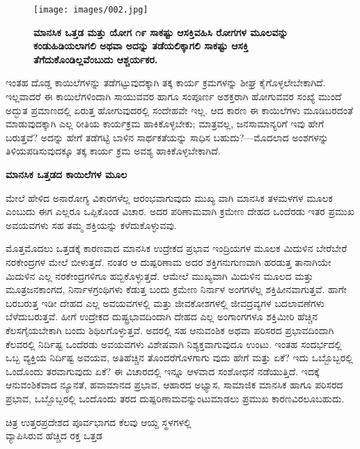 \begin{figure}
\texttt{[image: images/002.jpg]}
\caption{ \textbf{ಮಾನಸಿಕ ಒತ್ತಡ ಮತ್ತು ಯೋಗ ೧೯ ಸಾಕಷ್ಟು ಆಸಕ್ತಿವಹಿಸಿ ರೋಗಗಳ ಮೂಲವನ್ನು ಕಂಡುಹಿಡಿಯಲಾಗಲಿ ಅಥವಾ ಅದನ್ನು ತಡೆಯಲಿಕ್ಕಾಗಲಿ ಸಾಕಷ್ಟು ಆಸಕ್ತಿ ತೆಗೆದುಕೊಂಡಿಲ್ಲವೆಂಬುದು ಆಶ್ಚರ್ಯಕರ.} }
\end{figure}

ಇಂತಹ ದೊಡ್ಡ ಕಾಯಿಲೆಗಳನ್ನು ತಡೆಗಟ್ಟುವುದಕ್ಕಾಗಿ ತಕ್ಕ ಕಾರ್ಯ ಕ್ರಮಗಳನ್ನು ಶೀಘ್ರ ಕೈಗೊಳ್ಳಲೇಬೇಕಾಗಿದೆ. ಇಲ್ಲವಾದರೆ ಈ ಕಾಯಿಲೆಗಳಿಂದಾಗಿ ಸಾಯುವವರ ಹಾಗೂ ಸಂಪೂರ್ಣ ಅಶಕ್ತರಾಗಿ ಹೋಗುವವರ ಸಂಖ್ಯೆ ಮುಂದೆ ಅದ್ಭುತ ಪ್ರಮಾಣದಲ್ಲಿ ಏರುತ್ತ ಹೋಗುವುದರಲ್ಲಿ ಸಂದೇಹವೇ ಇಲ್ಲ. ಆದ ಕಾರಣ ಈ ಕಾಯಿಲೆಗಳು ಮೂಡಿಬರದಂತೆ ಮಾಡುವುದಕ್ಕಾಗಿ ಎಲ್ಲ ರೀತಿಯ ಕಾರ್ಯಕ್ರಮ ಹಾಕಿಕೊಳ್ಳಬೇಕು; ಮಾತ್ರವಲ್ಲ, ಜನಸಾಮಾನ್ಯರಿಗೆ ಇವು ಹೇಗೆ ಬರುತ್ತವೆ? ಅದನ್ನು ಹೇಗೆ ತಡೆಗಟ್ಟಿ ಬಾಳಿನ ಸಾರ್ಥಕತೆಯನ್ನು ಸಾಧಿಸ ಬಹುದು?—ಮೊದಲಾದ ಅಂಶಗಳನ್ನು ತಿಳಿಯಪಡಿಸುವುದಕ್ಕೂ ತಕ್ಕ ಕಾರ್ಯ ಕ್ರಮ ಅವಶ್ಯ ಹಾಕಿಕೊಳ್ಳಬೇಕಾಗಿದೆ.

\textbf{ಮಾನಸಿಕ ಒತ್ತಡದ ಕಾಯಿಲೆಗಳ ಮೂಲ}

ಮೇಲೆ ಹೇಳಿದ ಅನಾರೋಗ್ಯ ವಿಕಾರಗಳೆಲ್ಲ ಆರಂಭವಾಗುವುದು ಮುಖ್ಯ ವಾಗಿ ಮಾನಸಿಕ ತಳಮಳಗಳ ಮೂಲಕ ಎಂಬುದು ಈಗ ಎಲ್ಲರೂ ಒಪ್ಪಿಕೊಂಡ ವಿಚಾರ. ಅದರ ಪರಿಣಾಮವಾಗಿ ಕ್ರಮೇಣ ದೇಹದ ಒಂದೆರಡು ಇತರ ಪ್ರಮುಖ ಅವಯವಗಳು ಸಹ ತಮ್ಮ ಶಕ್ತಿಯನ್ನು ಕಳೆದುಕೊಳ್ಳುವವು.

ಮೊತ್ತಮೊದಲು ಒತ್ತಡಕ್ಕೆ ಕಾರಣವಾದ ಮಾನಸಿಕ ಉದ್ರೇಕದ ಪ್ರಭಾವ ಇಂದ್ರಿಯಗಳ ಮೂಲಕ ಮಿದುಳಿನ ಬೇರೆಬೇರೆ ನರಕೇಂದ್ರಗಳ ಮೇಲೆ ಬೀಳುತ್ತದೆ. ನಂತರ ಆ ದುಷ್ಪರಿಣಾಮ ಅದರ ಶಕ್ತಿಗನುಗುಣವಾಗಿ ಹರಡುತ್ತ ತಾನಾಗಿಯೇ ಮಿದುಳಿನ ಎಲ್ಲ ನರಕೇಂದ್ರಗಳಿಗೂ ಹಬ್ಬಿಕೊಳ್ಳುತ್ತದೆ. ಆಮೇಲೆ ಮುಖ್ಯವಾಗಿ ಮಿದುಳಿನ ಮೂಲದ ಮತ್ತು ಮೂತ್ರಜನಕಾಂಗದ, ನಿರ್ನಾಳಗ್ರಂಥಿಗಳು  ಕೆಡುತ್ತ ಬಂದು ಕ್ರಮೇಣ ನಿರ್ನಾಳ ಅಂಗಗಳೆಲ್ಲ  ಶಕ್ತಿಹೀನವಾಗುತ್ತವೆ. ಹಾಗೇ ಬರಬರುತ್ತ ಇಡೀ ದೇಹದ ಎಲ್ಲ ಅವಯವಗಳಲ್ಲಿ ಮತ್ತು ಜೀವಕೋಶಗಳಲ್ಲಿ ಜೀವದ್ರವ್ಯಗಳ ಬದಲಾವಣೆಗಳು  ಬೆಳೆದುಬರುತ್ತವೆ. ಹೀಗೆ ಉದ್ರೇಕದ ದುಷ್ಟ್ರಭಾವದಿಂದಾಗಿ ದೇಹದ ಎಲ್ಲ ಅಂಗಾಂಗಗಳೂ ಶಕ್ತಿಮೀರಿ ಹೆಚ್ಚಿನ ಕೆಲಸಗೈಯಬೇಕಾಗಿ ಬಂದು ಶಿಥಿಲಗೊಳ್ಳುತ್ತವೆ. ಅದರಲ್ಲಿ ಸಹ ಆನುವಂಶಿಕ ಅಥವಾ ಪರಿಸರದ ಪ್ರಭಾವದಿಂದಾಗಿ ಕೆಲವರಲ್ಲಿ ನಿರ್ದಿಷ್ಟ ಒಂದೆರಡು ಅವಯವಗಳು ವಿಶೇಷವಾಗಿ ನಿಶ್ಯಕ್ತವಾಗುವುದೂ ಉಂಟು. ಇಂತಹ ಸಂದರ್ಭದಲ್ಲಿ ಒಬ್ಬ ವ್ಯಕ್ತಿಯ ನಿರ್ದಿಷ್ಟ ಅವಯವ, ಅತಿಹೆಚ್ಚಿನ ತೊಂದರೆಗೊಳಗಾಗು ವುದು ಹೇಗೆ ಮತ್ತು ಏಕೆ? ಇದು ಒಬ್ಬೊಬ್ಬರಲ್ಲಿ ಒಂದೊಂದು ತರವಾಗುವುದು ಏಕೆ? ಈ ವಿಚಾರದಲ್ಲಿ ಇನ್ನೂ ಆಳವಾದ ಸಂಶೋಧನೆ ನಡೆಯುತ್ತಿದೆ. ಇದಕ್ಕೆ ಆನುವಂಶಿಕವಾದ ನ್ಯೂನತೆ, ಹವಾಮಾನದ ಪ್ರಭಾವ, ಆಹಾರದ ಅಭ್ಯಾಸ, ಸಾಮಾಜಿಕ ಮಾನಸಿಕ ಹಾಗೂ ಪರಿಸರದ ಪ್ರಭಾವ, ಒಬ್ಬೊಬ್ಬರಲ್ಲಿ ಒಂದೊಂದು ತರದ ದುಷ್ಪರಿಣಾಮವನ್ನುಂಟುಮಾಡಲು ಪ್ರಮುಖ ಕಾರಣವಿರಲೂಬಹುದು.

\begin{center}
ಚಿತ್ರ  ಉತ್ತರಪ್ರದೇಶದ ಪೂರ್ವಭಾಗದ ಕೆಲವು ಆಯ್ದ ಸ್ಥಳಗಳಲ್ಲಿ\\ವ್ಯಾಪಿಸಿರುವ ಹೆಚ್ಚಿದ ರಕ್ತ ಒತ್ತಡ 
\end{center}


